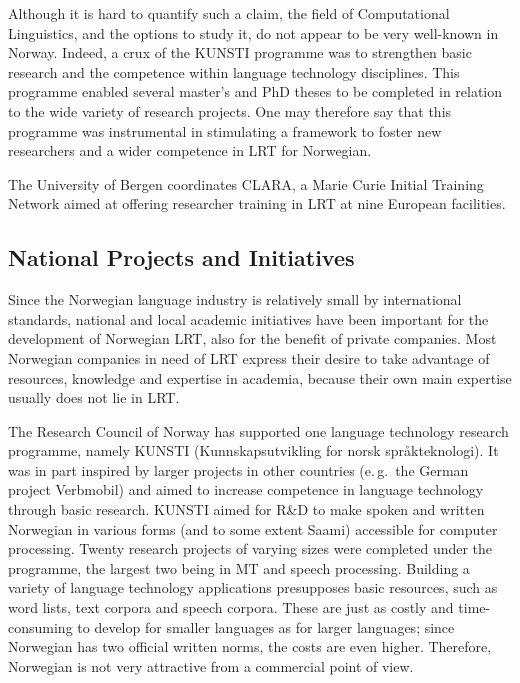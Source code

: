 \begin{multicols}{2}
Although it is hard to quantify such a claim, the field of Computational Linguistics, and the options to study it, do not appear to be very well-known in Norway. 
Indeed, a crux of the KUNSTI programme was to strengthen basic research and the competence within language technology disciplines. %
This programme enabled several master's and PhD theses to be completed in relation to the wide variety of research projects. 
One may therefore say that this programme was instrumental in stimulating a framework to foster new researchers and a wider competence in LRT for Norwegian.

The University of Bergen coordinates CLARA, a Marie Curie Initial Training Network aimed at offering researcher training in LRT at nine European facilities.

\subsection{National Projects and Initiatives}

Since the Norwegian language industry is relatively small by international standards, national and local academic initiatives have been important for the development of Norwegian LRT, also for the benefit of private companies.
Most Norwegian companies in need of LRT express their desire to take advantage of resources, knowledge and expertise in academia, because their own main expertise usually does not lie in LRT.

The Research Council of Norway has supported one language technology research programme, namely KUNSTI (Kunnskapsutvikling for norsk språkteknologi).
It was in part inspired by larger projects in other countries (e.\,g.~the German project Verbmobil) and aimed to increase competence in language technology through basic research. 
KUNSTI aimed for R\&D to make spoken and written Norwegian in various forms (and to some extent Saami) accessible for computer processing. 
Twenty research projects of varying sizes were completed under the programme, the largest two being in MT and speech processing. Building a variety of language technology applications presupposes basic resources, such as word lists, text corpora and speech corpora. 
These are just as costly and time-consuming to develop for smaller languages as for larger languages; since Norwegian has two official written norms, the costs are even higher. 
Therefore, Norwegian is not very attractive from a commercial point of view. 


\end{multicols}

